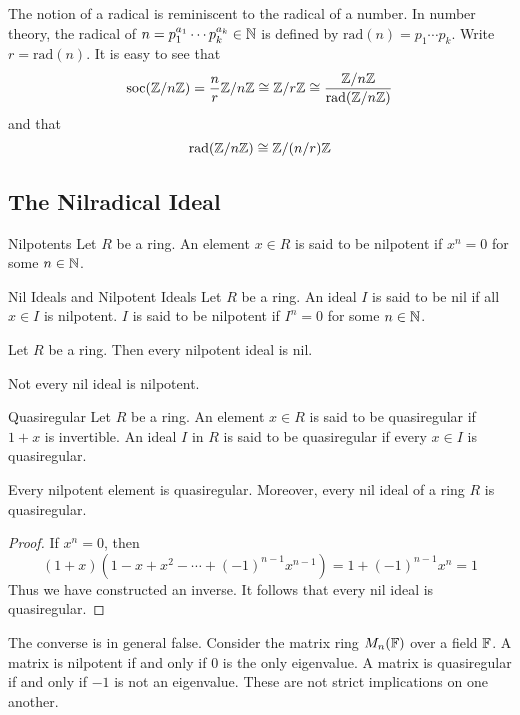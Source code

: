\documentclass[a4paper]{article}
\begin{document}
The notion of a radical is reminiscent to the radical of a number. In number theory, the radical of $n=p_1^{a_1}\cdots p_k^{a_k}\in\mathbb{N}$ is defined by $\text{rad}(n)=p_1\cdots p_k$. Write $r=\text{rad}(n)$. It is easy to see that $$\text{soc}(\mathbb{Z}/n\mathbb{Z})=\frac{n}{r}\mathbb{Z}/n\mathbb{Z}\cong\mathbb{Z}/r\mathbb{Z}\cong\frac{\mathbb{Z}/n\mathbb{Z}}{\text{rad}(\mathbb{Z}/n\mathbb{Z})}$$ and that $$\text{rad}(\mathbb{Z}/n\mathbb{Z})\cong\mathbb{Z}/(n/r)\mathbb{Z}$$

\subsection{The Nilradical Ideal}
\begin{defn}{Nilpotents}{} Let $R$ be a ring. An element $x\in R$ is said to be nilpotent if $x^n=0$ for some $n\in\mathbb{N}$. 
\end{defn}

\begin{defn}{Nil Ideals and Nilpotent Ideals}{} Let $R$ be a ring. An ideal $I$ is said to be nil if all $x\in I$ is nilpotent. $I$ is said to be nilpotent if $I^n=0$ for some $n\in\mathbb{N}$. 
\end{defn}

\begin{lmm}{}{} Let $R$ be a ring. Then every nilpotent ideal is nil. 
\end{lmm}

Not every nil ideal is nilpotent. 

\begin{defn}{Quasiregular}{} Let $R$ be a ring. An element $x\in R$ is said to be quasiregular if $1+x$ is invertible. An ideal $I$ in $R$ is said to be quasiregular if every $x\in I$ is quasiregular. 
\end{defn}

\begin{lmm}{}{} Every nilpotent element is quasiregular. Moreover, every nil ideal of a ring $R$ is quasiregular. \tcbline
\begin{proof}
If $x^n=0$, then $$(1+x)(1-x+x^2-\cdots+(-1)^{n-1}x^{n-1})=1+(-1)^{n-1}x^n=1$$ Thus we have constructed an inverse. It follows that every nil ideal is quasiregular. 
\end{proof}
\end{lmm}

The converse is in general false. Consider the matrix ring $M_n(\mathbb{F})$ over a field $\mathbb{F}$. A matrix is nilpotent if and only if $0$ is the only eigenvalue. A matrix is quasiregular if and only if $-1$ is not an eigenvalue. These are not strict implications on one another. \\~\\
\end{document}
